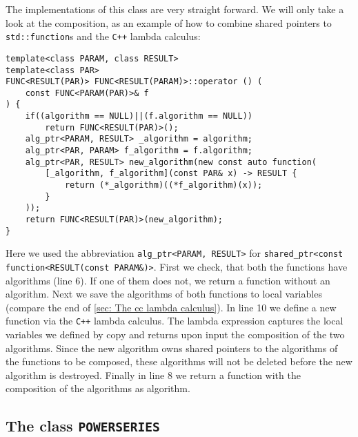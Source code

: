 \documentclass{article}
\newcommand{\cc}{\texttt{C++}\xspace}
\newcommand{\code}[1]{\texttt{#1}}
\newcommand{\func}[1]{\texttt{#1}}
\begin{document}
The implementations of this class are very straight forward. We will only take a look at the composition, as an example of how to combine shared pointers to \code{std::function}s and the \cc lambda calculus:
\begin{lstlisting}
template<class PARAM, class RESULT>
template<class PAR>
FUNC<RESULT(PAR)> FUNC<RESULT(PARAM)>::operator () (
	const FUNC<PARAM(PAR)>& f
) {
	if((algorithm == NULL)||(f.algorithm == NULL))
		return FUNC<RESULT(PAR)>();
	alg_ptr<PARAM, RESULT> _algorithm = algorithm;
	alg_ptr<PAR, PARAM> f_algorithm = f.algorithm;
	alg_ptr<PAR, RESULT> new_algorithm(new const auto function(
		[_algorithm, f_algorithm](const PAR& x) -> RESULT {
			return (*_algorithm)((*f_algorithm)(x));
		}
	));
	return FUNC<RESULT(PAR)>(new_algorithm);
}
\end{lstlisting}
Here we used the abbreviation \code{alg\_ptr<PARAM, RESULT>} for \code{shared\_ptr<const function<RESULT(const PARAM\&)>}. First we check, that both the functions have algorithms (line 6). If one of them does not, we return a function without an algorithm. Next we save the algorithms of both functions to local variables (compare the end of \cref{sec: The cc lambda calculus}). In line 10 we define a new function via the \cc lambda calculus. The lambda expression captures the local variables we defined by copy and returns upon input the composition of the two algorithms. Since the new algorithm owns shared pointers to the algorithms of the functions to be composed, these algorithms will not be deleted before the new algorithm is destroyed. Finally in line 8 we return a function with the composition of the algorithms as algorithm.


\subsection{The class \func{POWERSERIES}}
\end{document}

